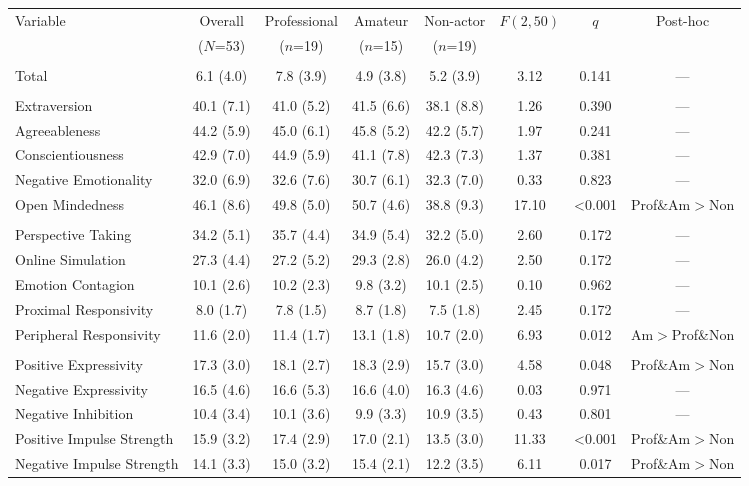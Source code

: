 \begin{tabular}{@{} >{\raggedright\arraybackslash}p{3.6cm} *{4}{c} cc c@{}}
\toprule
Variable & Overall & Professional & Amateur & Non-actor & $F(2,50)$ & $q$ & Post-hoc \\
 & ($N$=53) & ($n$=19) & ($n$=15) & ($n$=19) & & & \\
\midrule
\multicolumn{8}{@{}l@{}}{\textit{BDI-II}} \\
\quad Total & 6.1 (4.0) & 7.8 (3.9) & 4.9 (3.8) & 5.2 (3.9) & 3.12 & 0.141 & --- \\
\addlinespace[0.28ex]
\multicolumn{8}{@{}l@{}}{\textit{BFI-2}} \\
\quad Extraversion & 40.1 (7.1) & 41.0 (5.2) & 41.5 (6.6) & 38.1 (8.8) & 1.26 & 0.390 & --- \\
\quad Agreeableness & 44.2 (5.9) & 45.0 (6.1) & 45.8 (5.2) & 42.2 (5.7) & 1.97 & 0.241 & --- \\
\quad Conscientiousness & 42.9 (7.0) & 44.9 (5.9) & 41.1 (7.8) & 42.3 (7.3) & 1.37 & 0.381 & --- \\
\quad Negative Emotionality & 32.0 (6.9) & 32.6 (7.6) & 30.7 (6.1) & 32.3 (7.0) & 0.33 & 0.823 & --- \\
\quad Open Mindedness & 46.1 (8.6) & 49.8 (5.0) & 50.7 (4.6) & 38.8 (9.3) & 17.10 & <0.001 & Prof\&Am$>$Non \\
\addlinespace[0.28ex]
\multicolumn{8}{@{}l@{}}{\textit{QCAE}} \\
\quad Perspective Taking & 34.2 (5.1) & 35.7 (4.4) & 34.9 (5.4) & 32.2 (5.0) & 2.60 & 0.172 & --- \\
\quad Online Simulation & 27.3 (4.4) & 27.2 (5.2) & 29.3 (2.8) & 26.0 (4.2) & 2.50 & 0.172 & --- \\
\quad Emotion Contagion & 10.1 (2.6) & 10.2 (2.3) & 9.8 (3.2) & 10.1 (2.5) & 0.10 & 0.962 & --- \\
\quad Proximal Responsivity & 8.0 (1.7) & 7.8 (1.5) & 8.7 (1.8) & 7.5 (1.8) & 2.45 & 0.172 & --- \\
\quad Peripheral Responsivity & 11.6 (2.0) & 11.4 (1.7) & 13.1 (1.8) & 10.7 (2.0) & 6.93 & 0.012 & Am$>$Prof\&Non \\
\addlinespace[0.28ex]
\multicolumn{8}{@{}l@{}}{\textit{BEQ}} \\
\quad Positive Expressivity & 17.3 (3.0) & 18.1 (2.7) & 18.3 (2.9) & 15.7 (3.0) & 4.58 & 0.048 & Prof\&Am$>$Non \\
\quad Negative Expressivity & 16.5 (4.6) & 16.6 (5.3) & 16.6 (4.0) & 16.3 (4.6) & 0.03 & 0.971 & --- \\
\quad Negative Inhibition & 10.4 (3.4) & 10.1 (3.6) & 9.9 (3.3) & 10.9 (3.5) & 0.43 & 0.801 & --- \\
\quad Positive Impulse Strength & 15.9 (3.2) & 17.4 (2.9) & 17.0 (2.1) & 13.5 (3.0) & 11.33 & <0.001 & Prof\&Am$>$Non \\
\quad Negative Impulse Strength & 14.1 (3.3) & 15.0 (3.2) & 15.4 (2.1) & 12.2 (3.5) & 6.11 & 0.017 & Prof\&Am$>$Non \\
\bottomrule
\end{tabular}